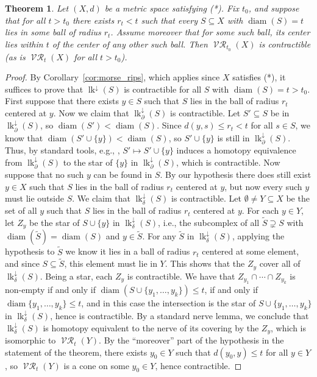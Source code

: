 \documentclass[a4paper,11pt]{amsart}
\newtheorem{theorem}{Theorem}[section]
\theoremstyle{definition}
\DeclareMathOperator{\diam}{diam}
\DeclareMathOperator{\Rips}{\mathcal{VR}}
\newcommand{\lk}{\operatorname{lk}}
\newcommand{\dlk}{\lk^\downarrow\!}
\newcommand{\dflk}{\lk^\downarrow_\partial}
\newcommand{\dclk}{\lk^\downarrow_\delta}
\numberwithin{equation}{section}
\begin{document}
\begin{theorem}\label{thrm:cible}
Let $(X,d)$ be a metric space satisfying \textnormal{(*)}. Fix $t_0$, and suppose that for all $t>t_0$ there exists $r_t<t$ such that every $S\subseteq X$ with $\diam(S)=t$ lies in some ball of radius $r_t$. Assume moreover that for some such ball, its center lies within $t$ of the center of any other such ball. Then $\Rips_{t_0}(X)$ is contractible (as is $\Rips_t(X)$ for all $t>t_0$).
\end{theorem}

\begin{proof}
By Corollary~\ref{cor:morse_rips}, which applies since $X$ satisfies (*), it suffices to prove that $\dlk(S)$ is contractible for all $S$ with $\diam(S)=t>t_0$. First suppose that there exists $y\in S$ such that $S$ lies in the ball of radius $r_t$ centered at $y$. Now we claim that $\dflk(S)$ is contractible. Let $S'\subseteq S$ be in $\dflk(S)$, so $\diam(S')<\diam(S)$. Since $d(y,s)\le r_t<t$ for all $s\in S$, we know that $\diam(S'\cup\{y\})<\diam(S)$, so $S'\cup\{y\}$ is still in $\dflk(S)$. Thus, by standard tools, e.g., \cite[Subsection~1.3]{quillen78}, $S'\mapsto S'\cup\{y\}$ induces a homotopy equivalence from $\dflk(S)$ to the star of $\{y\}$ in $\dflk(S)$, which is contractible. Now suppose that no such $y$ can be found in $S$. By our hypothesis there does still exist $y\in X$ such that $S$ lies in the ball of radius $r_t$ centered at $y$, but now every such $y$ must lie outside $S$. We claim that $\dclk(S)$ is contractible. Let $\emptyset\ne Y\subseteq X$ be the set of all $y$ such that $S$ lies in the ball of radius $r_t$ centered at $y$. For each $y\in Y$, let $Z_y$ be the star of $S\cup\{y\}$ in $\dclk(S)$, i.e., the subcomplex of all $\widetilde{S}\supsetneq S$ with $\diam(\widetilde{S})=\diam(S)$ and $y\in\widetilde{S}$. For any $\widetilde{S}$ in $\dclk(S)$, applying the hypothesis to $\widetilde{S}$ we know it lies in a ball of radius $r_t$ centered at some element, and since $S\subseteq \widetilde{S}$, this element must lie in $Y$. This shows that the $Z_y$ cover all of $\dclk(S)$. Being a star, each $Z_y$ is contractible. We have that $Z_{y_1}\cap\cdots\cap Z_{y_k}$ is non-empty if and only if $\diam(S\cup\{y_1,\dots,y_k\})\le t$, if and only if $\diam\{y_1,\dots,y_k\}\le t$, and in this case the intersection is the star of $S\cup\{y_1,\dots,y_k\}$ in $\dclk(S)$, hence is contractible. By a standard nerve lemma, we conclude that $\dclk(S)$ is homotopy equivalent to the nerve of its covering by the $Z_y$, which is isomorphic to $\Rips_t(Y)$. By the ``moreover'' part of the hypothesis in the statement of the theorem, there exists $y_0\in Y$ such that $d(y_0,y)\le t$ for all $y\in Y$, so $\Rips_t(Y)$ is a cone on some $y_0\in Y$, hence contractible.
\end{proof}
\end{document}

